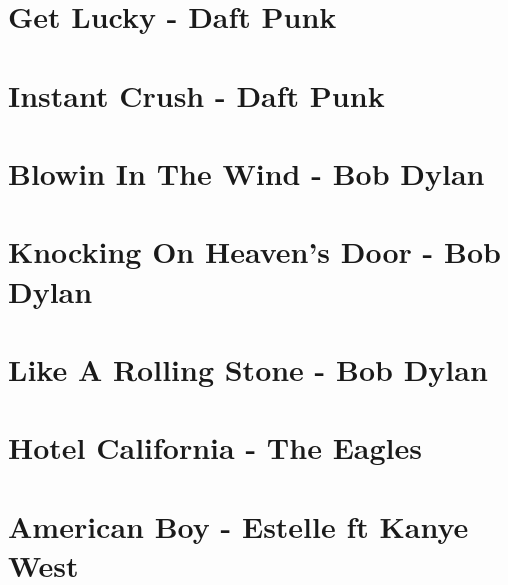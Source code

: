 \documentclass{guitartabs}
\begin{document}
\section{Get Lucky - Daft Punk}
\begin{guitar}

\end{guitar}


\section{Instant Crush - Daft Punk}
\begin{guitar}

\end{guitar}





\section*{Blowin In The Wind - Bob Dylan}
\begin{guitar}

\end{guitar}



\section{Knocking On Heaven's Door - Bob Dylan}
\begin{guitar}

\end{guitar}

\section*{Like A Rolling Stone - Bob Dylan}
\begin{guitar}

\end{guitar}





\section{Hotel California - The Eagles}
\begin{guitar}

\end{guitar}


\section{American Boy - Estelle ft Kanye West}
\begin{guitar}

\end{guitar}
\end{document}

